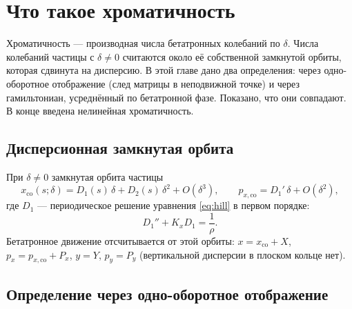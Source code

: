 \section{Что такое хроматичность}
\label{sec:def}

Хроматичность --- производная числа бетатронных колебаний по $\delta$. Числа колебаний частицы с $\delta\neq0$ считаются около её собственной замкнутой орбиты, которая сдвинута на дисперсию. В этой главе дано два определения: через одно-оборотное отображение (след матрицы в неподвижной точке) и через гамильтониан, усреднённый по бетатронной фазе. Показано, что они совпадают. В конце введена нелинейная хроматичность.

\subsection{Дисперсионная замкнутая орбита}

При $\delta\neq0$ замкнутая орбита частицы
\begin{equation}
\label{eq:co}
x_{\mathrm{co}}(s;\delta)=D_1(s)\,\delta+D_2(s)\,\delta^2+O(\delta^3),
\qquad
p_{x,\mathrm{co}}=D_1'\,\delta+O(\delta^2),
\end{equation}
где $D_1$ --- периодическое решение уравнения \eqref{eq:hill} в первом порядке:
\begin{equation}
\label{eq:D1}
D_1''+K_x D_1=\frac{1}{\rho}.
\end{equation}
Бетатронное движение отсчитывается от этой орбиты: $x=x_{\mathrm{co}}+X$, $p_x=p_{x,\mathrm{co}}+P_x$, $y=Y$, $p_y=P_y$ (вертикальной дисперсии в плоском кольце нет).

\subsection{Определение через одно-оборотное отображение}

